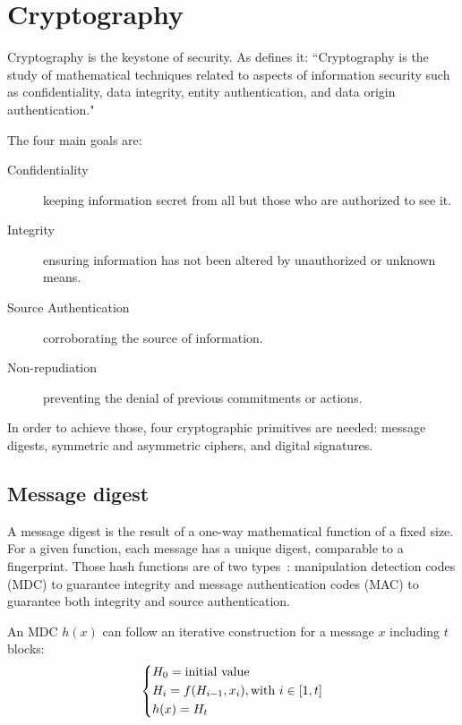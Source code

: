 \section{Cryptography}

Cryptography is the keystone of security. As \citet{Menezes1996} defines it: ``Cryptography is the study of mathematical techniques related to aspects of information security such as confidentiality, data integrity, entity authentication, and data origin authentication."

The four main goals are:
\begin{description}
	\item[Confidentiality] keeping information secret from all but those who are authorized to see it.
	\item[Integrity] ensuring information has not been altered by unauthorized or unknown means.
	\item[Source Authentication] corroborating the source of information.
	\item[Non-repudiation] preventing the denial of previous commitments or actions.
\end{description}

In order to achieve those, four cryptographic primitives are needed: message digests, symmetric and asymmetric ciphers, and digital signatures.








\subsection{Message digest}
A message digest is the result of a one-way mathematical function of a fixed size.
For a given function, each message has a unique digest, comparable to a fingerprint.
Those hash functions are of two types~\cite{infof405}: manipulation detection codes (MDC) to guarantee integrity and message authentication codes (MAC) to guarantee both integrity and source authentication.


An MDC $h(x)$ can follow an iterative construction for a message $x$ including $t$ blocks:
\[
\begin{dcases}
	H_0 = \mbox{initial value}\\
	H_i = f(H_{i-1}, x_i), \mbox{with } i \in [1,t]\\
	h(x) = H_t\\
\end{dcases}
\]

